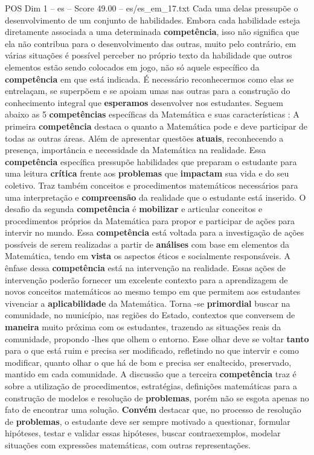 \begin{textsample}{POS Dim 1 – es – Score 49.00 – es/es\_em\_17.txt}
Cada uma delas pressupõe o desenvolvimento de um conjunto de habilidades.
Embora cada habilidade esteja diretamente associada a uma determinada \textbf{competência}, isso não significa que ela não contribua para o desenvolvimento das outras, muito pelo contrário, em várias situações é possível perceber no próprio texto da habilidade que outros elementos estão sendo colocados em jogo, não só aquele específico da \textbf{competência} em que está indicada.
É necessário reconhecermos como elas se entrelaçam, se superpõem e se apoiam umas nas outras para a construção do conhecimento integral que \textbf{esperamos} desenvolver nos estudantes.
Seguem abaixo as 5 \textbf{competências} específicas da Matemática e suas características : A primeira \textbf{competência} destaca o quanto a Matemática pode e deve participar de todas as outras áreas.
Além de apresentar questões \textbf{atuais}, reconhecendo a presença, importância e necessidade da Matemática na realidade.
Essa \textbf{competência} específica pressupõe habilidades que preparam o estudante para uma leitura \textbf{crítica} frente aos \textbf{problemas} que \textbf{impactam} sua vida e do seu coletivo.
Traz também conceitos e procedimentos matemáticos necessários para uma interpretação e \textbf{compreensão} da realidade que o estudante está inserido.
O desafio da segunda \textbf{competência} é \textbf{mobilizar} e articular conceitos e procedimentos próprios da Matemática para propor e participar de ações para intervir no mundo.
Essa \textbf{competência} está voltada para a investigação de ações possíveis de serem realizadas a partir de \textbf{análises} com base em elementos da Matemática, tendo em \textbf{vista} os aspectos éticos e socialmente responsáveis.
A ênfase dessa \textbf{competência} está na intervenção na realidade.
Essas ações de intervenção poderão fornecer um excelente contexto para a aprendizagem de novos conceitos matemáticos ao mesmo tempo em que permitem aos estudantes vivenciar a \textbf{aplicabilidade} da Matemática.
Torna -se \textbf{primordial} buscar na comunidade, no município, nas regiões do Estado, contextos que conversem de \textbf{maneira} muito próxima com os estudantes, trazendo as situações reais da comunidade, propondo -lhes que olhem o entorno.
Esse olhar deve se voltar \textbf{tanto} para o que está ruim e precisa ser modificado, refletindo no que intervir e como modificar, quanto olhar o que há de bom e precisa ser enaltecido, preservado, mantido em cada comunidade.
A discussão que a terceira \textbf{competência} traz é sobre a utilização de procedimentos, estratégias, definições matemáticas para a construção de modelos e resolução de \textbf{problemas}, porém não se esgota apenas no fato de encontrar uma solução. \textbf{Convém} destacar que, no processo de resolução de \textbf{problemas}, o estudante deve ser sempre motivado a questionar, formular hipóteses, testar e validar essas hipóteses, buscar contraexemplos, modelar situações com expressões matemáticas, com outras representações.

\end{textsample}
